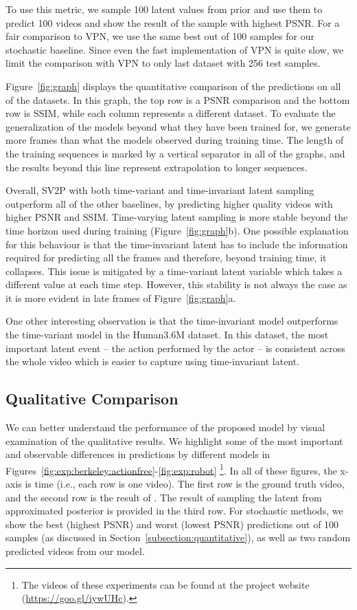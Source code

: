 \documentclass{article} \usepackage{iclr2018_conference,times}
\begin{document}
To use this metric, we sample 100 latent values from prior  and use them to predict 100 videos and show the result of the sample with highest PSNR. For a fair comparison to VPN, we use the same best out of 100 samples for our stochastic baseline. Since even the fast implementation of VPN is quite slow, we limit the comparison with VPN to only last dataset with 256 test samples.

Figure~\ref{fig:graph} displays the quantitative comparison of the predictions on all of the datasets. In this graph, the top row is a PSNR comparison and the bottom row is SSIM, while each column represents a different dataset. To evaluate the generalization of the models beyond what they have been trained for, we generate more frames than what the models observed during training time. The length of the training sequences is marked by a vertical separator in all of the graphs, and the results beyond this line represent extrapolation to longer sequences.

Overall, SV2P with both time-variant and time-invariant latent sampling outperform all of the other baselines, by predicting higher quality videos with higher PSNR and SSIM. Time-varying latent sampling is more stable beyond the time horizon used during training (Figure~\ref{fig:graph}b). One possible explanation for this behaviour is that the time-invariant latent has to include the information required for predicting all the frames and therefore, beyond training time, it collapses. This issue is mitigated by a time-variant latent variable which takes a different value at each time step. However, this stability is not always the case as it is more evident in late frames of  Figure~\ref{fig:graph}a. 

One other interesting observation is that the time-invariant model outperforms the time-variant model in the Human3.6M dataset. In this dataset, the most important latent event -- the action performed by the actor -- is consistent across the whole video which is easier to capture using time-invariant latent.




\subsection{Qualitative Comparison}
\label{subsection:qualitative}
We can better understand the performance of the proposed model by visual examination of the qualitative results. We highlight some of the most important and observable differences in predictions by different models in Figures~\ref{fig:exp:berkeley:actionfree}-\ref{fig:exp:robot} \footnote{The videos of these experiments can be found at the project website (\url{https://goo.gl/iywUHc}).}. In all of these figures, the x-axis is time (i.e., each row is one video). The first row is the ground truth video, and the second row is the result of \cite{finn2016unsupervised}. The result of sampling the latent from approximated posterior is provided in the third row. For stochastic methods, we show the best (highest PSNR) and worst (lowest PSNR) predictions out of 100 samples (as discussed in Section~\ref{subsection:quantitative}), as well as two random predicted videos from our model. 
\end{document}
